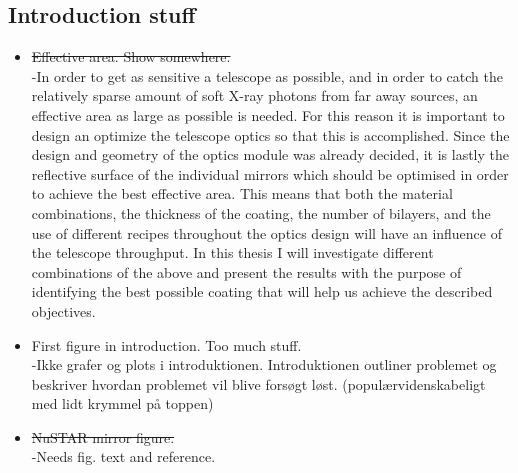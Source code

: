 \subsection{Introduction stuff}
\begin{itemize}
  \item \st{Effective area. Show somewhere.}\\
      -In order to get as sensitive a telescope as possible, and in order to catch the relatively sparse amount of soft X-ray photons from far away sources, an effective area as large as possible is needed. For this reason it is important to design an optimize the telescope optics so that this is accomplished. Since the design and geometry of the optics module was already decided, it is lastly the reflective surface of the individual mirrors which should be optimised in order to achieve the best effective area. This means that both the material combinations, the thickness of the coating, the number of bilayers, and the use of different recipes throughout the optics design will have an influence of the telescope throughput. In this thesis I will investigate different combinations of the above and present the results with the purpose of identifying the best possible coating that will help us achieve the described objectives.
  \item First figure in introduction. Too much stuff.\\
      -Ikke grafer og plots i introduktionen. Introduktionen outliner problemet og beskriver hvordan problemet vil blive forsøgt løst. (populærvidenskabeligt med lidt krymmel på toppen)
  \item \st{NuSTAR mirror figure.}\\
      -Needs fig. text and reference.



\end{itemize}


